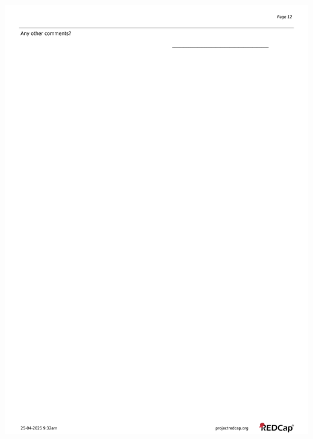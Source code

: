 \documentclass[
]{scrartcl}
\begin{document}
\includegraphics{../case-record-form/instrument-pdfs/pages/all-instruments-12.pdf}
\end{document}
